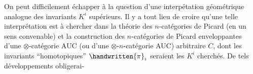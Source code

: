 On peut difficilement échapper à la question d'une interpétation géométrique analogue des invariants $K^{i}$ supérieurs. Il y a tout lieu de croire qu'une telle interprétation est à chercher dans la théorie des $n$-catégories de Picard (en un sens convenable) et la construction des $n$-catégories de Picard enveloppantes d'une $\otimes$-catégorie AUC (ou d'une $\otimes$-$n$-catégorie AUC) arbitraire $C$, dont les invariants ``homotopiques'' $\handwritten{\pi}_{i}$ seraient les $K^{i}$ cherchés. De tels développements obligerai-


